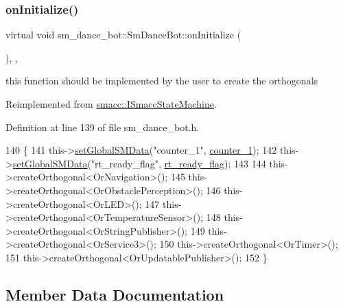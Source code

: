 \subsubsection{\texorpdfstring{on\+Initialize()}{onInitialize()}}
{\footnotesize\ttfamily virtual void sm\+\_\+dance\+\_\+bot\+::\+Sm\+Dance\+Bot\+::on\+Initialize (\begin{DoxyParamCaption}{ }\end{DoxyParamCaption})\hspace{0.3cm}{\ttfamily [inline]}, {\ttfamily [override]}, {\ttfamily [virtual]}}



this function should be implemented by the user to create the orthogonals 



Reimplemented from \hyperlink{classsmacc_1_1ISmaccStateMachine_ac2982c6c8283663e5e1e8a7c82f511ec}{smacc\+::\+I\+Smacc\+State\+Machine}.



Definition at line 139 of file sm\+\_\+dance\+\_\+bot.\+h.


\begin{DoxyCode}
140     \{
141         this->\hyperlink{classsmacc_1_1ISmaccStateMachine_a8588f9e580fbb95b53e2bd2ca3ff1f98}{setGlobalSMData}(\textcolor{stringliteral}{"counter\_1"}, \hyperlink{structsm__dance__bot_1_1SmDanceBot_ab3b8db557ce94d34c60b291911eb140c}{counter\_1});
142         this->\hyperlink{classsmacc_1_1ISmaccStateMachine_a8588f9e580fbb95b53e2bd2ca3ff1f98}{setGlobalSMData}(\textcolor{stringliteral}{"rt\_ready\_flag"}, \hyperlink{structsm__dance__bot_1_1SmDanceBot_a0f0587a13670ad8925555cd8f6cb6b2d}{rt\_ready\_flag});
143 
144         this->createOrthogonal<OrNavigation>();
145         this->createOrthogonal<OrObstaclePerception>();
146         this->createOrthogonal<OrLED>();
147         this->createOrthogonal<OrTemperatureSensor>();
148         this->createOrthogonal<OrStringPublisher>();
149         this->createOrthogonal<OrService3>();
150         this->createOrthogonal<OrTimer>();
151         this->createOrthogonal<OrUpdatablePublisher>();
152     \}
\end{DoxyCode}


\subsection{Member Data Documentation}
\mbox{\label{structsm__dance__bot_1_1SmDanceBot_ab3b8db557ce94d34c60b291911eb140c}} 
